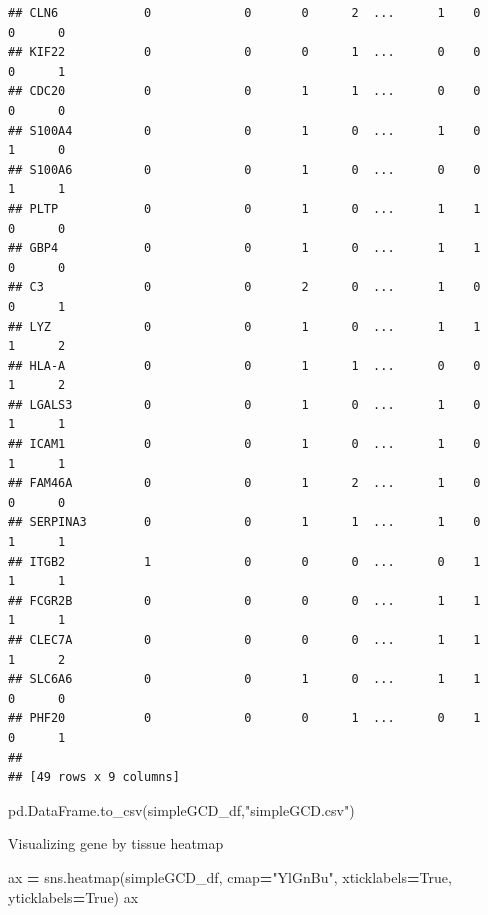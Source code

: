 \documentclass[
]{article}
\newenvironment{Shaded}{\begin{snugshade}}{\end{snugshade}}
\newcommand{\NormalTok}[1]{#1}
\newcommand{\OperatorTok}[1]{\textcolor[rgb]{0.81,0.36,0.00}{\textbf{#1}}}
\newcommand{\StringTok}[1]{\textcolor[rgb]{0.31,0.60,0.02}{#1}}
\newcommand{\VariableTok}[1]{\textcolor[rgb]{0.00,0.00,0.00}{#1}}
\begin{document}
\begin{verbatim}
## CLN6            0             0       0      2  ...      1    0        0      0
## KIF22           0             0       0      1  ...      0    0        0      1
## CDC20           0             0       1      1  ...      0    0        0      0
## S100A4          0             0       1      0  ...      1    0        1      0
## S100A6          0             0       1      0  ...      0    0        1      1
## PLTP            0             0       1      0  ...      1    1        0      0
## GBP4            0             0       1      0  ...      1    1        0      0
## C3              0             0       2      0  ...      1    0        0      1
## LYZ             0             0       1      0  ...      1    1        1      2
## HLA-A           0             0       1      1  ...      0    0        1      2
## LGALS3          0             0       1      0  ...      1    0        1      1
## ICAM1           0             0       1      0  ...      1    0        1      1
## FAM46A          0             0       1      2  ...      1    0        0      0
## SERPINA3        0             0       1      1  ...      1    0        1      1
## ITGB2           1             0       0      0  ...      0    1        1      1
## FCGR2B          0             0       0      0  ...      1    1        1      1
## CLEC7A          0             0       0      0  ...      1    1        1      2
## SLC6A6          0             0       1      0  ...      1    1        0      0
## PHF20           0             0       0      1  ...      0    1        0      1
## 
## [49 rows x 9 columns]
\end{verbatim}

\begin{Shaded}
\begin{Highlighting}[]
\NormalTok{pd.DataFrame.to_csv(simpleGCD_df,}\StringTok{"simpleGCD.csv"}\NormalTok{)}
\end{Highlighting}
\end{Shaded}

Visualizing gene by tissue heatmap

\begin{Shaded}
\begin{Highlighting}[]
\NormalTok{ax }\OperatorTok{=}\NormalTok{ sns.heatmap(simpleGCD_df, cmap}\OperatorTok{=}\StringTok{"YlGnBu"}\NormalTok{, xticklabels}\OperatorTok{=}\VariableTok{True}\NormalTok{, yticklabels}\OperatorTok{=}\VariableTok{True}\NormalTok{)}
\NormalTok{ax}
\end{Highlighting}
\end{Shaded}
\end{document}

